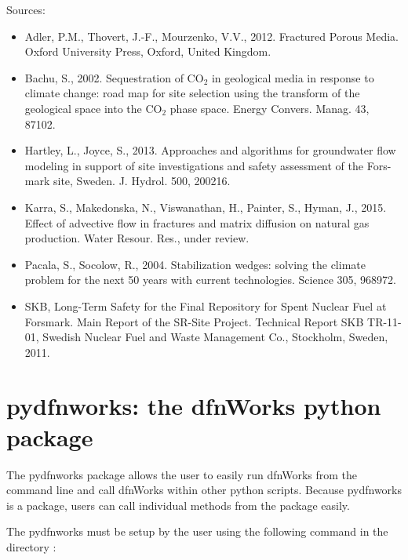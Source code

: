 \documentclass[letterpaper,10pt,english]{sphinxmanual}
\begin{document}
Sources:
\begin{itemize}
\item {} 
Adler, P.M., Thovert, J.-F., Mourzenko, V.V., 2012. Fractured Porous Media. Oxford University Press, Oxford, United Kingdom.

\item {} 
Bachu, S., 2002. Sequestration of CO$_{\text{2}}$  in geological media in response to climate change: road map for site selection using the transform of the geological space into the CO$_{\text{2}}$  phase space. Energy Convers. Manag. 43, 87\textendash{}102.

\item {} 
Hartley, L., Joyce, S., 2013. Approaches and algorithms for groundwater flow modeling in support of site investigations and safety assessment of the Fors- mark site, Sweden. J. Hydrol. 500, 200\textendash{}216.

\item {} 
Karra, S., Makedonska, N., Viswanathan, H., Painter, S., Hyman, J., 2015. Effect of advective flow in fractures and matrix diffusion on natural gas production. Water Resour. Res., under review.

\item {} 
Pacala, S., Socolow, R., 2004. Stabilization wedges: solving the climate problem for the next 50 years with current technologies. Science 305, 968\textendash{}972.

\item {} 
SKB, Long-Term Safety for the Final Repository for Spent Nuclear Fuel at Forsmark. Main Report of the SR-Site Project. Technical Report SKB TR-11-01, Swedish Nuclear Fuel and Waste Management Co., Stockholm, Sweden, 2011.

\end{itemize}


\chapter{pydfnworks: the dfnWorks python package}
\label{\detokenize{pydfnworks:dfnworks-python-chapter}}\label{\detokenize{pydfnworks::doc}}\label{\detokenize{pydfnworks:pydfnworks-the-dfnworks-python-package}}
The pydfnworks package allows the user to easily run dfnWorks from the command line and  call dfnWorks within other python scripts. Because pydfnworks is a package, users can call individual methods from the package easily.

The pydfnworks must be setup by the user using the following command in the directory  :
\end{document}
